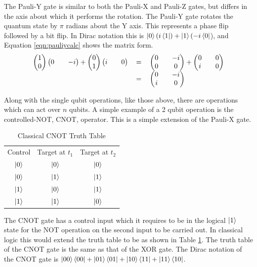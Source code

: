 The Pauli-Y gate is similar to both the Pauli-X and Pauli-Z gates, but differs in the axis about which it performs the rotation.
The Pauli-Y gate rotates the quantum state by $\pi$ radians about the Y axis.
This represents a phase flip followed by a bit flip.
In Dirac notation this is $\left\vert{0}\right\rangle(i\left\langle{1}\right\vert) + \left\vert{1}\right\rangle(-i\left\langle{0}\right\vert$), and Equation \ref{eqn:pauliycalc} shows the matrix form.
\begin{equation}
\label{eqn:pauliycalc}
\begin{tabular}{ r c l }
\(\begin {pmatrix}
1 \\
0
\end{pmatrix}
\begin {pmatrix}
0 &&
-i
\end{pmatrix}
 + 
\begin {pmatrix}
0 \\
1
\end{pmatrix}
\begin {pmatrix}
i &&
0
\end{pmatrix}\)
& \(=\)
& \( 
\begin{pmatrix}
0 && -i \\
0 && 0
\end{pmatrix}
 + 
\begin{pmatrix}
0 && 0\\
i && 0
\end{pmatrix}
\) \\
& \(=\)
& \( 
\begin{pmatrix}
0 && -i \\
i && 0
\end{pmatrix}
\)
\end{tabular}
\end{equation}

Along with the single qubit operations, like those above, there are operations which can act over $n$ qubits.
A simple example of a 2 qubit operation is the controlled-NOT, CNOT, operator.
This is a simple extension of the Pauli-X gate.
\begin{table}
\centering
\begin{tabular}{ c | c || c | }
Control & Target at $t_1$ & Target at $t_2$ \\
$\left\vert{0}\right\rangle$ & $\left\vert{0}\right\rangle$ & $\left\vert{0}\right\rangle$ \\
$\left\vert{0}\right\rangle$ & $\left\vert{1}\right\rangle$ & $\left\vert{1}\right\rangle$ \\
$\left\vert{1}\right\rangle$ & $\left\vert{0}\right\rangle$ & $\left\vert{1}\right\rangle$ \\
$\left\vert{1}\right\rangle$ & $\left\vert{1}\right\rangle$ & $\left\vert{0}\right\rangle$ \\
\end{tabular}
\caption{Classical CNOT Truth Table}
\label{CNOTTruthTable}
\end{table}
The CNOT gate has a control input which it requires to be in the logical $\left\vert{1}\right\rangle$ state for the NOT operation on the second input to be carried out.
In classical logic this would extend the truth table to be as shown in Table \ref{CNOTTruthTable}.
The truth table of the CNOT gate is the same as that of the XOR gate.
The Dirac notation of the CNOT gate is $\left\vert{00}\right\rangle\left\langle{00}\right\vert+\left\vert{01}\right\rangle\left\langle{01}\right\vert+\left\vert{10}\right\rangle\left\langle{11}\right\vert+\left\vert{11}\right\rangle\left\langle{10}\right\vert$.


